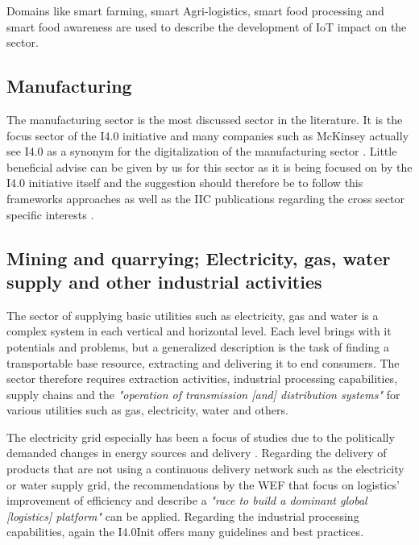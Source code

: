 
Domains like smart farming, smart Agri-logistics, smart food processing and smart food awareness are used to describe the development of \ac{IoT} impact on the sector.




\subsection{Manufacturing}
The manufacturing sector is the most discussed sector in the literature. It is the focus sector of the \ac{I4.0} initiative and many companies such as McKinsey actually see \ac{I4.0} as a synonym for the digitalization of the manufacturing sector \cite[]{McKinseydigitizationIndustrialSector:2015}. Little beneficial advise can be given by us for this sector as it is being focused on by the \ac{I4.0} initiative itself and the suggestion should therefore be to follow this frameworks approaches as well as the \ac{IIC} publications regarding the cross sector specific interests \cite[]{iicarchitecture:2016}.

\subsection{Mining and quarrying; Electricity, gas, water supply and other industrial activities }

The sector of supplying basic utilities such as electricity, gas and water is a complex system in each vertical and horizontal level. Each level brings with it potentials and problems, but a generalized description is the task of finding a transportable base resource, extracting and delivering it to end consumers. The sector therefore requires extraction activities, industrial processing capabilities, supply chains and the \emph{"operation of transmission [and] distribution systems"}\cite[p. 166ff.]{ISIC:2008} for various utilities such as gas, electricity, water and others.

The electricity grid especially has been a focus of studies due to the politically demanded changes in energy sources and delivery \cite[p.12ff.]{AppelrathKagermannMayer2012}. Regarding the delivery of products that are not using a continuous delivery network such as the electricity or water supply grid, the recommendations by the \ac{WEF} that focus on logistics' improvement of efficiency and describe a \emph{"race to build a dominant global [logistics] platform"}\cite{worldforumlogistics:2016} can be applied. Regarding the industrial processing capabilities, again the \acf{I4.0Init} offers many guidelines and best practices.

